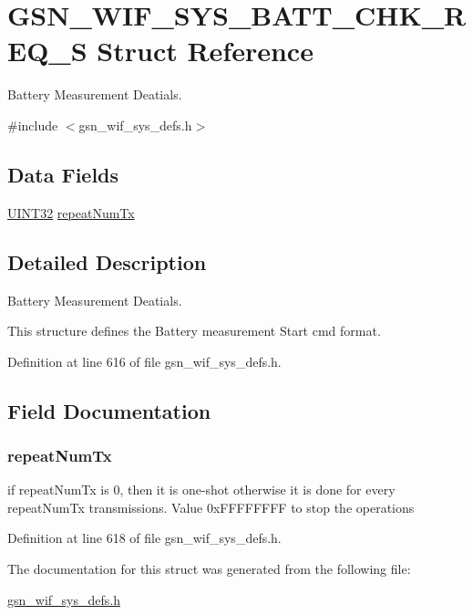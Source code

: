 \hypertarget{a00346}{
\section{GSN\_\-WIF\_\-SYS\_\-BATT\_\-CHK\_\-REQ\_\-S Struct Reference}
\label{a00346}
}


Battery Measurement Deatials.  




{\ttfamily \#include $<$gsn\_\-wif\_\-sys\_\-defs.h$>$}

\subsection*{Data Fields}
\begin{DoxyCompactItemize}
\item 
\hyperlink{a00660_gae1e6edbbc26d6fbc71a90190d0266018}{UINT32} \hyperlink{a00346_ae87ba7370de811b8d4b21e3538ebe293}{repeatNumTx}
\end{DoxyCompactItemize}


\subsection{Detailed Description}
Battery Measurement Deatials. 

This structure defines the Battery measurement Start cmd format. 

Definition at line 616 of file gsn\_\-wif\_\-sys\_\-defs.h.



\subsection{Field Documentation}
\hypertarget{a00346_ae87ba7370de811b8d4b21e3538ebe293}{
\subsubsection[{repeatNumTx}]{ {\bf repeatNumTx}}}
\label{a00346_ae87ba7370de811b8d4b21e3538ebe293}
if repeatNumTx is 0, then it is one-\/shot otherwise it is done for every repeatNumTx transmissions. Value 0xFFFFFFFF to stop the operations 

Definition at line 618 of file gsn\_\-wif\_\-sys\_\-defs.h.



The documentation for this struct was generated from the following file:\begin{DoxyCompactItemize}
\item 
\hyperlink{a00612}{gsn\_\-wif\_\-sys\_\-defs.h}\end{DoxyCompactItemize}
